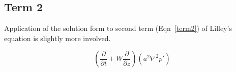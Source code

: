 \documentclass[]{aiaa-tc}%
\begin{document}





\clearpage
\subsection{Term 2}

Application of the solution form to second term (Eqn~\ref{term2}) of Lilley's equation is slightly more involved.

\begin{equation}\label{term2}
\left( \dfrac{\partial}{\partial t} + W \dfrac{\partial}{\partial z} \right) (\overline{a^2}\nabla^2p')
\end{equation}
\end{document}
